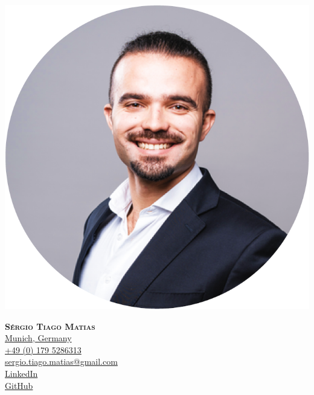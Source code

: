 \documentclass[letterpaper,11pt]{article}
\begin{document}

\noindent
\begin{minipage}[c]{0.3\textwidth}
    \includegraphics[width=\linewidth]{CV_Picture.png}
\end{minipage}
\hfill
\begin{minipage}[c]{0.65\textwidth}
    \begin{center}
        \textbf{\Huge \scshape Sérgio Tiago Matias}\\[3pt]
        \vspace{4pt}
        \faMapMarker \hspace{.5pt} \href{https://www.google.com/maps/place/Munich/@48.1549958,11.4594364,12z/data=!3m1!4b1!4m6!3m5!1s0x479e75f9a38c5fd9:0x10cb84a7db1987d!8m2!3d48.1351253!4d11.5819805!16s%2Fm%2F02h6_6p?entry=ttu}{Munich, Germany}\\
        \vspace{4pt}
        {\faMobile \hspace{.5pt} \href{tel:01795286313}{+49 (0) 179 5286313}}\\
        \vspace{4pt}
        {\faAt \hspace{.5pt} \href{mailto:sergio.tiago.matias@gmail.com}{sergio.tiago.matias@gmail.com}}\\
        \vspace{4pt}
        \faLinkedinSquare \hspace{.5pt} \href{https://linkedin.com/in/sergiotiagomatias}{LinkedIn}\\
        \vspace{4pt}
        \faGithub \hspace{.5pt} \href{https://github.com/chiefmatias}{GitHub}
    \end{center}
\end{minipage}
\end{document}

